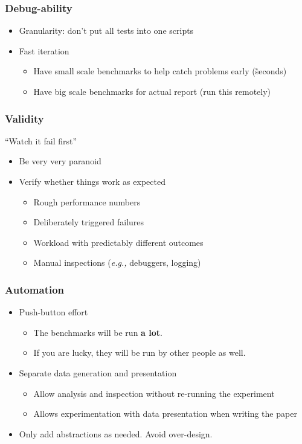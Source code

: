 \documentclass[xcolor={dvipsnames},aspectratio=149]{beamer}
\def\eg{\emph{e.g.,}\xspace}
\begin{document}
\begin{frame}
  \frametitle{Debug-ability}
  \begin{itemize}
  \item Granularity: don't put all tests into one scripts
  \item Fast iteration
    \begin{itemize}
    \item Have small scale benchmarks to help catch problems early (\~seconds)
    \item Have big scale benchmarks for actual report (run this remotely)
    \end{itemize}
  \end{itemize}
\end{frame}

\begin{frame}
  \frametitle{Validity}
  ``Watch it fail first''
  \begin{itemize}
  \item Be very very paranoid
  \item Verify whether things work as expected
    \begin{itemize}
    \item Rough performance numbers
    \item Deliberately triggered failures
    \item Workload with predictably different outcomes
    \item Manual inspections (\eg debuggers, logging)
    \end{itemize}
  \end{itemize}
\end{frame}

\begin{frame}
  \frametitle{Automation}
  \begin{itemize}
  \item Push-button effort
    \begin{itemize}
    \item The benchmarks will be run \textbf{a lot}.
    \item If you are lucky, they will be run by other people as well.
    \end{itemize}
  \item Separate data generation and presentation
    \begin{itemize}
    \item Allow analysis and inspection without re-running the experiment
    \item Allows experimentation with data presentation when writing the paper
    \end{itemize}
  \item Only add abstractions as needed. Avoid over-design.
  \end{itemize}
\end{frame}
\end{document}
